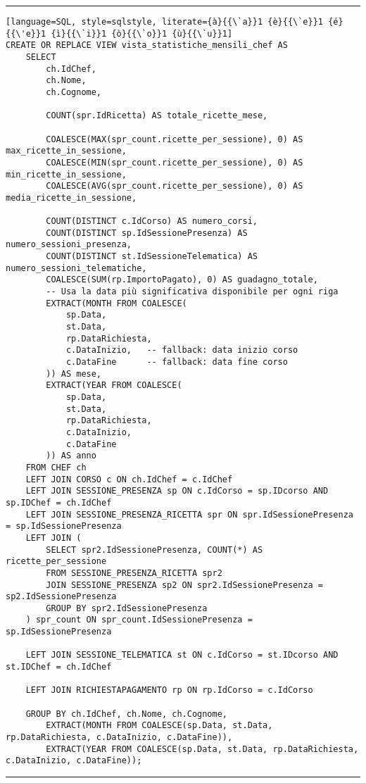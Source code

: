 \noindent\rule{\textwidth}{0.4pt}
\begin{lstlisting}[language=SQL, style=sqlstyle, literate={à}{{\`a}}1 {è}{{\`e}}1 {é}{{\'e}}1 {ì}{{\`i}}1 {ò}{{\`o}}1 {ù}{{\`u}}1]
CREATE OR REPLACE VIEW vista_statistiche_mensili_chef AS
    SELECT
        ch.IdChef,
        ch.Nome,
        ch.Cognome,

        COUNT(spr.IdRicetta) AS totale_ricette_mese,

        COALESCE(MAX(spr_count.ricette_per_sessione), 0) AS max_ricette_in_sessione,
        COALESCE(MIN(spr_count.ricette_per_sessione), 0) AS min_ricette_in_sessione,
        COALESCE(AVG(spr_count.ricette_per_sessione), 0) AS media_ricette_in_sessione,

        COUNT(DISTINCT c.IdCorso) AS numero_corsi,
        COUNT(DISTINCT sp.IdSessionePresenza) AS numero_sessioni_presenza,
        COUNT(DISTINCT st.IdSessioneTelematica) AS numero_sessioni_telematiche,
        COALESCE(SUM(rp.ImportoPagato), 0) AS guadagno_totale,
        -- Usa la data più significativa disponibile per ogni riga
        EXTRACT(MONTH FROM COALESCE(
            sp.Data,
            st.Data,
            rp.DataRichiesta,
            c.DataInizio,   -- fallback: data inizio corso
            c.DataFine      -- fallback: data fine corso
        )) AS mese,
        EXTRACT(YEAR FROM COALESCE(
            sp.Data,
            st.Data,
            rp.DataRichiesta,
            c.DataInizio,
            c.DataFine
        )) AS anno
    FROM CHEF ch
    LEFT JOIN CORSO c ON ch.IdChef = c.IdChef
    LEFT JOIN SESSIONE_PRESENZA sp ON c.IdCorso = sp.IDcorso AND sp.IDChef = ch.IdChef
    LEFT JOIN SESSIONE_PRESENZA_RICETTA spr ON spr.IdSessionePresenza = sp.IdSessionePresenza
    LEFT JOIN (
        SELECT spr2.IdSessionePresenza, COUNT(*) AS ricette_per_sessione
        FROM SESSIONE_PRESENZA_RICETTA spr2
        JOIN SESSIONE_PRESENZA sp2 ON spr2.IdSessionePresenza = sp2.IdSessionePresenza
        GROUP BY spr2.IdSessionePresenza
    ) spr_count ON spr_count.IdSessionePresenza = sp.IdSessionePresenza

    LEFT JOIN SESSIONE_TELEMATICA st ON c.IdCorso = st.IDcorso AND st.IDChef = ch.IdChef

    LEFT JOIN RICHIESTAPAGAMENTO rp ON rp.IdCorso = c.IdCorso

    GROUP BY ch.IdChef, ch.Nome, ch.Cognome,
        EXTRACT(MONTH FROM COALESCE(sp.Data, st.Data, rp.DataRichiesta, c.DataInizio, c.DataFine)),
        EXTRACT(YEAR FROM COALESCE(sp.Data, st.Data, rp.DataRichiesta, c.DataInizio, c.DataFine));
\end{lstlisting}
\noindent\rule{\textwidth}{0.4pt}

